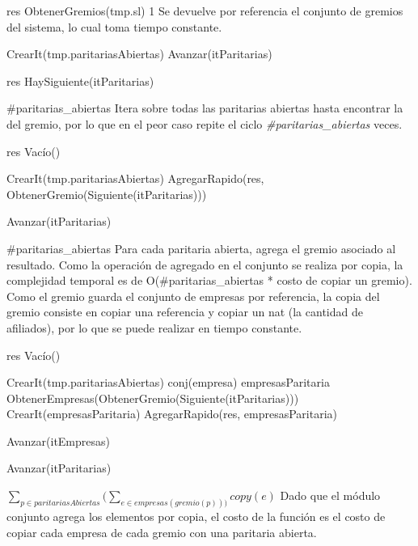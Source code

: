 {
	\state res \asig ObtenerGremios(tmp.sl)								
}
{1}
{ Se devuelve por referencia el conjunto de gremios del sistema, lo cual toma tiempo constante. }

{
	\state {} \asig CrearIt(tmp.paritariasAbiertas)		
			
		\state
		\state Avanzar(itParitarias)				
	\endwhile
	\state

	\state res \asig HaySiguiente(itParitarias)		
}
{\#paritarias\_abiertas}
{ Itera sobre todas las paritarias abiertas hasta encontrar la del gremio, por lo que en el peor caso repite el ciclo \emph{\#paritarias\_abiertas} veces. }

{
	\state res \asig Vacío()		
	\state

	\state {} \asig CrearIt(tmp.paritariasAbiertas)		
											
		\state
		\state AgregarRapido(res, ObtenerGremio(Siguiente(itParitarias)))			
		
		\state
		\state Avanzar(itParitarias)										
	\endwhile
}
{\#paritarias\_abiertas}
{ Para cada paritaria abierta, agrega el gremio asociado al resultado. Como la operaci\'on de agregado en el conjunto se realiza por copia, la complejidad temporal es de O(\#paritarias\_abiertas * costo de copiar un gremio). Como el gremio guarda el conjunto de empresas por referencia, la copia del gremio consiste en copiar una referencia y copiar un nat (la cantidad de afiliados), por lo que se puede realizar en tiempo constante. }

{
	\state res \asig Vacío()		
	\state

	\state {} \asig CrearIt(tmp.paritariasAbiertas)		
							
		\state
		\state conj(empresa) empresasParitaria \asig ObtenerEmpresas(ObtenerGremio(Siguiente(itParitarias)))		
		\state
		\state {} \asig CrearIt(empresasParitaria)	
			
			\state
			\state AgregarRapido(res, empresasParitaria)	
			
			\state
			\state Avanzar(itEmpresas)	
		\endwhile

		\state
		\state Avanzar(itParitarias)						
	\endwhile
}
{ \ensuremath{\sum_{p \in paritariasAbiertas} (\sum_{e \in empresas(gremio(p)))} copy(e)} }
{ Dado que el m\'odulo conjunto agrega los elementos por copia, el costo de la funci\'on es el costo de copiar cada empresa de cada gremio con una paritaria abierta. }

